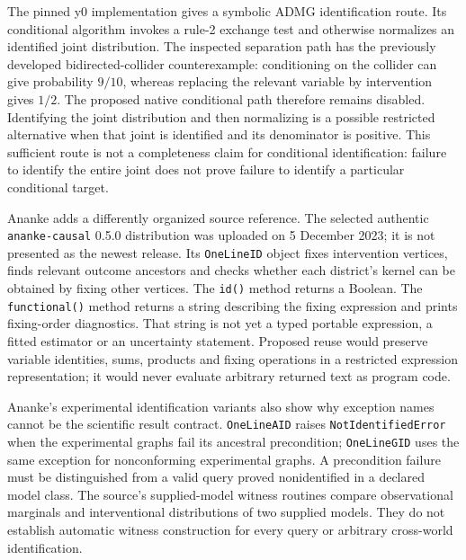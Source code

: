 The pinned y0 implementation gives a symbolic ADMG identification route.
Its conditional algorithm invokes a rule-2 exchange test and otherwise
normalizes an identified joint distribution. The inspected separation path has
the previously developed bidirected-collider counterexample: conditioning on
the collider can give probability $9/10$, whereas replacing the relevant
variable by intervention gives $1/2$. The proposed native conditional path
therefore remains disabled. Identifying the joint distribution and then
normalizing is a possible restricted alternative when that joint is identified
and its denominator is positive. This sufficient route is not a completeness
claim for conditional identification: failure to identify the entire joint
does not prove failure to identify a particular conditional target.
\citep{exec13_y0_id,exec13_y0_idc,exec13_y0_rule2,exec13_y0_separation,exec13_y0_oracles}

Ananke adds a differently organized source reference. The selected authentic
\texttt{ananke-causal} 0.5.0 distribution was uploaded on 5 December 2023; it is
not presented as the newest release. Its \texttt{OneLineID} object fixes
intervention vertices, finds relevant outcome ancestors and checks whether
each district's kernel can be obtained by fixing other vertices. The \texttt{id()}
method returns a Boolean. The \texttt{functional()} method returns a string
describing the fixing expression and prints fixing-order diagnostics. That
string is not yet a typed portable expression, a fitted estimator or an
uncertainty statement. Proposed reuse would preserve variable identities,
sums, products and fixing operations in a restricted expression representation;
it would never evaluate arbitrary returned text as program code.
\citep{exec18_pyid_one_line,exec18_pyid_contract}

Ananke's experimental identification variants also show why exception names
cannot be the scientific result contract. \texttt{OneLineAID} raises
\texttt{NotIdentifiedError} when the experimental graphs fail its ancestral
precondition; \texttt{OneLineGID} uses the same exception for nonconforming
experimental graphs. A precondition failure must be distinguished from a
valid query proved nonidentified in a declared model class. The source's
supplied-model witness routines compare observational marginals and
interventional distributions of two supplied models. They do not establish
automatic witness construction for every query or arbitrary cross-world
identification.\citep{exec18_pyid_one_line}

